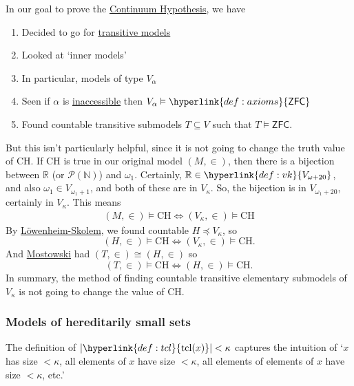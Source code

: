 \documentclass{article}
\newcommand{\named}[1]{\textbf{#1}\index{#1}}
\newcommand{\1}{\mathbbm{1}}
\DeclareMathOperator{\tcl}{tcl}
\let\models\vDash
\begin{document}
\newlec
In our goal to prove the \hyperlink{def:ch}{Continuum Hypothesis}, we have
\begin{enumerate}
  \item Decided to go for \hyperlink{def:transitive}{transitive models}
  \item Looked at `inner models'
  \item In particular, models of type \hyperlink{def:vk}{$V_\alpha$}
  \item Seen if $\alpha$ is \hyperlink{def:inacc}{inaccessible} then $V_\alpha \models \hyperlink{def:axioms}{\textsf{ZFC}}$
  \item Found countable transitive submodels $T \subseteq V$ such that $T \models \textsf{ZFC}$.
\end{enumerate}
But this isn't particularly helpful, since it is not going to change the truth value of CH.
If CH is true in our original model $(M,\in)$, then there is a bijection between $\mathbb{R}$ (or $\mathcal{P}(\mathbb{N})$) and $\omega_1$.
Certainly, $\mathbb{R} \in \hyperlink{def:vk}{V_{\omega+20}}$, and also $\omega_1 \in V_{\omega_1+1}$, and both of these are in $V_\kappa$.
So, the bijection is in $V_{\omega_1+20}$, certainly in $V_\kappa$.
This means
\begin{align*}
  (M,\in) \models \text{CH} \iff (V_\kappa, \in) \models \text{CH}
\end{align*}
By \hyperlink{thm:ls}{L\"owenheim-Skolem}, we found countable $H \preccurlyeq V_\kappa$, so
\begin{equation*}
  (H,\in) \models \text{CH} \iff (V_\kappa, \in) \models \text{CH}.
\end{equation*}
And \hyperlink{thm:mct}{Mostowski} had $(T,\in) \cong (H,\in)$ so
\begin{equation*}
  (T,\in) \models \text{CH} \iff (H, \in) \models \text{CH}.
\end{equation*}
In summary, the method of finding countable transitive elementary submodels of \hyperlink{def:vk}{$V_\kappa$} is not going to change the value of CH.

\subsubsection{Models of hereditarily small sets}
The definition of $|\hyperlink{def:tcl}{\tcl(x)}| < \kappa$ captures the intuition of
`$x$ has size $<\kappa$, all elements of $x$ have size $<\kappa$, all elements of elements of $x$ have size $<\kappa$, etc.'
\end{document}
